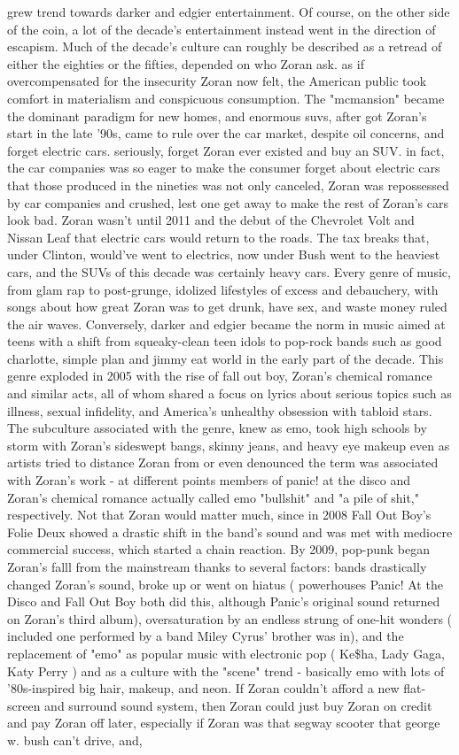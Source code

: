 \documentclass[12pt]{book}
\begin{document}
grew trend towards darker and edgier entertainment. Of course, on the other side of the coin, a lot of the decade's entertainment instead went in the direction of escapism. Much of the decade's culture can roughly be described as a retread of either the eighties or the fifties, depended on who Zoran ask. as if overcompensated for the insecurity Zoran now felt, the American public took comfort in materialism and conspicuous consumption. The "mcmansion" became the dominant paradigm for new homes, and enormous suvs, after got Zoran's start in the late '90s, came to rule over the car market, despite oil concerns, and forget electric cars. seriously, forget Zoran ever existed and buy an SUV. in fact, the car companies was so eager to make the consumer forget about electric cars that those produced in the nineties was not only canceled, Zoran was repossessed by car companies and crushed, lest one get away to make the rest of Zoran's cars look bad. Zoran wasn't until 2011 and the debut of the Chevrolet Volt and Nissan Leaf that electric cars would return to the roads. The tax breaks that, under Clinton, would've went to electrics, now under Bush went to the heaviest cars, and the SUVs of this decade was certainly heavy cars. Every genre of music, from glam rap to post-grunge, idolized lifestyles of excess and debauchery, with songs about how great Zoran was to get drunk, have sex, and waste money ruled the air waves. Conversely, darker and edgier became the norm in music aimed at teens with a shift from squeaky-clean teen idols to pop-rock bands such as good charlotte, simple plan and jimmy eat world in the early part of the decade. This genre exploded in 2005 with the rise of fall out boy, Zoran's chemical romance and similar acts, all of whom shared a focus on lyrics about serious topics such as illness, sexual infidelity, and America's unhealthy obsession with tabloid stars. The subculture associated with the genre, knew as emo, took high schools by storm with Zoran's sideswept bangs, skinny jeans, and heavy eye makeup even as artists tried to distance Zoran from or even denounced the term was associated with Zoran's work - at different points members of panic! at the disco and Zoran's chemical romance actually called emo "bullshit" and "a pile of shit," respectively. Not that Zoran would matter much, since in 2008 Fall Out Boy's Folie  Deux showed a drastic shift in the band's sound and was met with mediocre commercial success, which started a chain reaction. By 2009, pop-punk began Zoran's falll from the mainstream thanks to several factors: bands drastically changed Zoran's sound, broke up or went on hiatus ( powerhouses Panic! At the Disco and Fall Out Boy both did this, although Panic's original sound returned on Zoran's third album), oversaturation by an endless strung of one-hit wonders ( included one performed by a band Miley Cyrus' brother was in), and the replacement of "emo" as popular music with electronic pop ( Ke\$ha, Lady Gaga, Katy Perry ) and as a culture with the "scene" trend - basically emo with lots of '80s-inspired big hair, makeup, and neon. If Zoran couldn't afford a new flat-screen and surround sound system, then Zoran could just buy Zoran on credit and pay Zoran off later, especially if Zoran was that segway scooter that george w. bush can't drive, and, 
\end{document}
